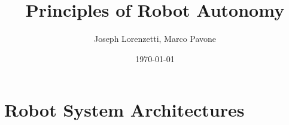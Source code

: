 \documentclass[nohyper,nobib]{tufte-book}
\title{Principles of Robot Autonomy}
\author{Joseph Lorenzetti, Marco Pavone}
\date{\today}
\begin{document}
\chapter{Robot System Architectures}


\printbibliography
\end{document}
